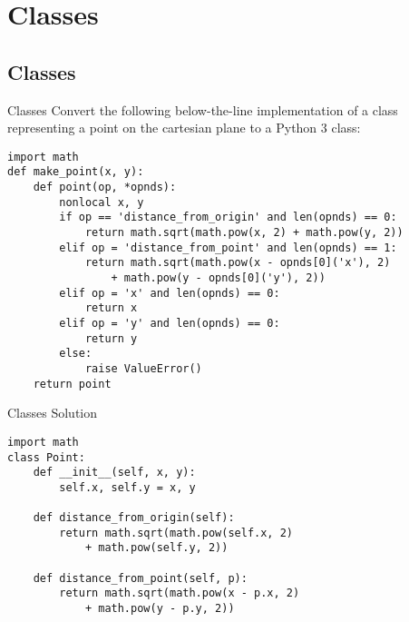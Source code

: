 \documentclass[9pt]{beamer}
\begin{document}
\section{Classes}
\subsection{Classes}

\begin{frame}[fragile]{Classes}
  Convert the following below-the-line implementation of a class
  representing a point on the cartesian plane to a Python 3 class:

  \begin{lstlisting}[basicstyle=\small]
import math
def make_point(x, y):
    def point(op, *opnds):
        nonlocal x, y
        if op == 'distance_from_origin' and len(opnds) == 0:
            return math.sqrt(math.pow(x, 2) + math.pow(y, 2))
        elif op = 'distance_from_point' and len(opnds) == 1:
            return math.sqrt(math.pow(x - opnds[0]('x'), 2)
                + math.pow(y - opnds[0]('y'), 2))
        elif op = 'x' and len(opnds) == 0:
            return x
        elif op = 'y' and len(opnds) == 0:
            return y
        else:
            raise ValueError()
    return point
  \end{lstlisting}
\end{frame}

\begin{frame}[fragile]{Classes}
  Solution

  \begin{lstlisting}[basicstyle=\small]
import math
class Point:
    def __init__(self, x, y):
        self.x, self.y = x, y

    def distance_from_origin(self):
        return math.sqrt(math.pow(self.x, 2)
            + math.pow(self.y, 2))

    def distance_from_point(self, p):
        return math.sqrt(math.pow(x - p.x, 2)
            + math.pow(y - p.y, 2))
  \end{lstlisting}
\end{frame}
\end{document}
